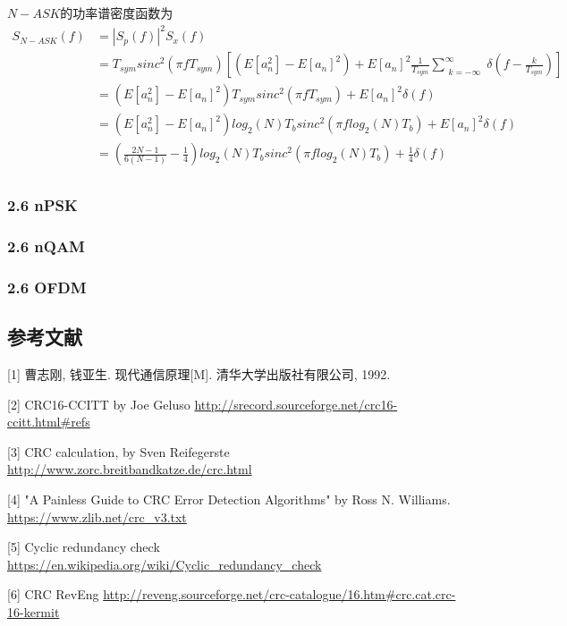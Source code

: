 \documentclass[
]{article}
\begin{document}
$N-ASK$的功率谱密度函数为
\begin{equation}
\begin{aligned}
S_{N-ASK}(f) &= {\left| S_p(f) \right|}^2 S_x(f) \\
&= T_{sym} sinc^2(\pi f T_{sym}) [(E[a_n^2]- E[a_n]^2) + E[a_n]^2 \frac{1}{T_{sym}} \sum\limits_{\substack{k=-\infty}}^{\infty} \delta(f-\frac{k}{T_{sym}})]\\
&= (E[a_n^2]- E[a_n]^2) T_{sym} sinc^2(\pi f T_{sym}) + E[a_n]^2 \delta(f)\\
&= (E[a_n^2]- E[a_n]^2) log_2(N) T_b sinc^2(\pi f log_2(N) T_b) + E[a_n]^2 \delta(f)\\
&= (\frac{2N-1}{6(N-1)} - \frac{1}{4}) log_2(N) T_b sinc^2(\pi f log_2(N) T_b) + \frac{1}{4} \delta(f)\\
\end{aligned}
\end{equation}


\hypertarget{header-n26}{%
\subsubsection{2.6 nPSK}\label{header-n26}}
\hypertarget{header-n26}{%
\subsubsection{2.6 nQAM}\label{header-n26}}
\hypertarget{header-n26}{%
\subsubsection{2.6 OFDM}\label{header-n26}}


\newpage
\hypertarget{header-n322}{%
\subsection{参考文献}\label{header-n322}}

{[}1{]} 曹志刚, 钱亚生. 现代通信原理{[}M{]}. 清华大学出版社有限公司,
1992.

{[}2{]} CRC16-CCITT by Joe Geluso
\url{http://srecord.sourceforge.net/crc16-ccitt.html#refs}

{[}3{]} CRC calculation, by Sven Reifegerste
\url{http://www.zorc.breitbandkatze.de/crc.html}

{[}4{]} "A Painless Guide to CRC Error Detection Algorithms" by Ross N.
Williams. \url{https://www.zlib.net/crc_v3.txt}

{[}5{]} Cyclic redundancy check
\url{https://en.wikipedia.org/wiki/Cyclic_redundancy_check}

{[}6{]} CRC RevEng
\url{http://reveng.sourceforge.net/crc-catalogue/16.htm#crc.cat.crc-16-kermit}
\end{document}
